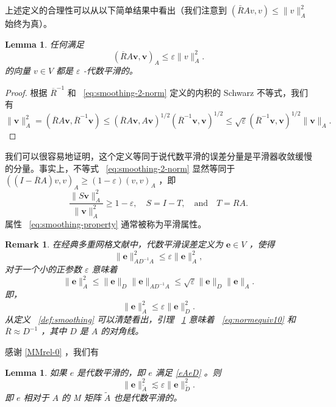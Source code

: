 \documentclass[12pt]{acta_2011xz}
\newtheorem{lemma}[theorem]{Lemma}
\newtheorem{remark}[theorem]{Remark}
\begin{document}
上述定义的合理性可以从以下简单结果中看出（我们注意到    $(\bar RAv, v)\le \|v\|_A^2$    始终为真）。
   \begin{lemma}   \label{lem:smoothing-1-norm}    任何满足    \begin{equation}\label{eq:smoothing-2-norm} (\overline{R}
A\bm{v},\bm{v})_A\le \varepsilon\|v\|^2_A.
\end{equation}    的向量    $v\in V$    都是    $\varepsilon$    -代数平滑的。  \end{lemma}    
   \begin{proof}根据    $\overline{R}^{-1}$    和~    \eqref{eq:smoothing-2-norm}    定义的内积的 Schwarz 不等式，我们有
   \[ \|\bm{v}\|^2_A = (\overline{R}A \bm{v}, \overline{R}^{-1}\bm{v})\le
(\overline{R}A \bm{v}, A\bm{v})^{1/2} (\overline{R}^{-1} \bm{v},
    \bm{v})^{1/2} \le \sqrt{\varepsilon} (\overline{R}^{-1} \bm{v},
\bm{v})^{1/2}\|\bm{v}\|_A.
\]     \end{proof}     

我们可以很容易地证明，这个定义等同于说代数平滑的误差分量是平滑器收敛缓慢的分量。事实上，不等式~   \eqref{eq:smoothing-2-norm}    显然等同于
   $((I-\overline{R}A) v,v )_A\ge (1-\varepsilon) (v,v)_A$    ，即
   \begin{equation}\label{eq:smoothing-property}
\frac{\|S\bm{v}\|_A^2}{\|\bm{v}\|_A^2} \ge 1-\varepsilon, \quad
S=I-T,\quad \mbox{and}\quad T=RA.
\end{equation}    属性~   \eqref{eq:smoothing-property}    通常被称为平滑属性。  

   \begin{remark}在经典多重网格文献中，代数平滑误差定义为    ${\bm e}\in V$   ，使得
   \begin{equation}\label{eq:ase} 
\|{\bm e}\|_{AD^{-1}A}^2 \leq \varepsilon \|{\bm e}\|_A^2,
 \end{equation}    对于一个小的正参数    $\varepsilon$    意味着
   \begin{equation}\label{eq:normequiv10} \|{\bm e}\|_A^2 \leq \|{\bm
    e}\|_D \|{\bm e}\|_ {AD^{-1}A}\leq \sqrt{\varepsilon} \|{\bm e}\|_D \|{\bm
e}\|_A .
 \end{equation}    即，
   \begin{equation}
   \label{eAeD}
\|{\bm e}\|_A^2\le \varepsilon \|{\bm e}\|_D^2.   
 \end{equation}    从定义~    \ref{def:smoothing}    可以清楚看出，引理~    \ref{lem:smoothing-1-norm}    意味着~    \eqref{eq:normequiv10}    和
   $\overline{R}\approx D^{-1}$    ，其中    $D$    是    $A$    的对角线。  \end{remark}    感谢    \eqref{MMrel-0}   ，我们有
   \begin{lemma}   \label{lem:eAeD}    如果    $e$    是代数平滑的，即    $e$    满足
   \eqref{eAeD}    。则 
   \begin{equation}
\|{\bm e}\|_{\tilde A}^2\lesssim\varepsilon \|{\bm e}\|_{\tilde D}^2.   
\end{equation}    即    $e$    相对于    $A$    的 M 矩阵    $\tilde A$    也是代数平滑的。  \end{lemma}     
\end{document}
